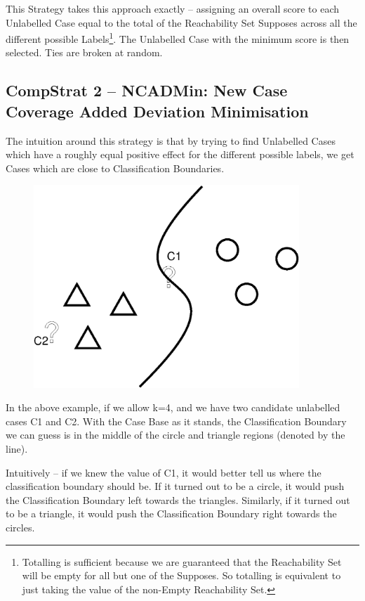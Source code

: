 \documentclass[a4paper,11pt]{report}
\begin{document}
This Strategy takes this approach exactly – assigning an overall score to each Unlabelled Case equal to the total of the Reachability Set Supposes across all the different possible Labels\footnote{Totalling is sufficient because we are guaranteed that the Reachability Set will be empty for all but one of the Supposes. So totalling is equivalent to just taking the value of the non-Empty Reachability Set.}. The Unlabelled Case with the minimum score is then selected. Ties are broken at random.

\subsection{CompStrat 2 – NCADMin: New Case Coverage Added Deviation Minimisation}

The intuition around this strategy is that by trying to find Unlabelled Cases which have a roughly equal positive effect for the different possible labels, we get Cases which are close to Classification Boundaries.

\begin{figure}[h!]
\includegraphics[width=10cm]{./Drawn/NCADMin}
\end{figure}

In the above example, if we allow k=4, and we have two candidate unlabelled cases C1 and C2. With the Case Base as it stands, the Classification Boundary we can guess is in the middle of the circle and triangle regions (denoted by the line).
 
Intuitively – if we knew the value of C1, it would better tell us where the classification boundary should be. If it turned out to be a circle, it would push the Classification Boundary left towards the triangles. Similarly, if it turned out to be a triangle, it would push the Classification Boundary right towards the circles. 
\end{document}
